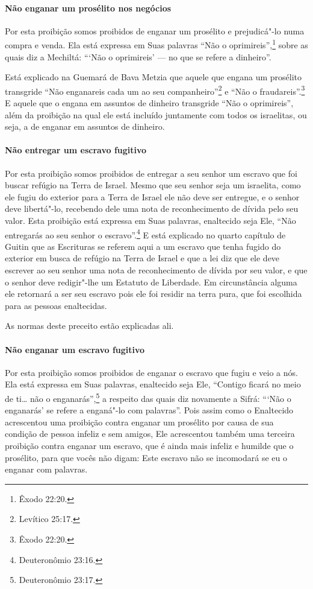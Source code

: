 \begin{multicols}{2}
\paragraph{Não enganar um prosélito nos negócios}

Por esta proibição somos proibidos de enganar um prosélito e
prejudicá"-lo numa compra e venda. Ela está expressa em Suas palavras
``Não o oprimireis'',\footnote{Êxodo 22:20.} sobre as quais diz a Mechiltá\starr: ```Não o
oprimireis' --- no que se refere a dinheiro''.

Está explicado na Guemará\starr{} de Bava Metzia\starr{} que aquele que engana um
prosélito transgride ``Não enganareis cada um ao seu companheiro''\footnote{Levítico 25:17.} e ``Não o fraudareis''.\footnote{Êxodo 22:20.} E aquele que o
engana em assuntos de dinheiro transgride ``Não o oprimireis'', além da
proibição na qual ele está incluído juntamente com todos os israelitas,
ou seja, a de enganar em assuntos de dinheiro.

\paragraph{Não entregar um escravo fugitivo}

Por esta proibição somos proibidos de entregar a seu senhor um escravo
que foi buscar refúgio na Terra de Israel. Mesmo que seu senhor seja um
israelita, como ele fugiu do exterior para a Terra de Israel ele não
deve ser entregue, e o senhor deve libertá"-lo, recebendo dele uma nota
de reconhecimento de dívida pelo seu valor. Esta proibição está
expressa em Suas palavras, enaltecido seja Ele, ``Não entregarás ao seu
senhor o escravo''.\footnote{Deuteronômio 23:16.} E está explicado no quarto
capítulo de Guitin\starr{} que as Escrituras se referem aqui a um escravo que
tenha fugido do exterior em busca de refúgio na Terra de Israel e que a
lei diz que ele deve escrever ao seu senhor uma nota de reconhecimento
de dívida por seu valor, e que o senhor deve redigir"-lhe um Estatuto de
Liberdade. Em circunstância alguma ele retornará a ser seu escravo pois
ele foi residir na terra pura, que foi escolhida para as pessoas
enaltecidas.

As normas deste preceito estão explicadas ali.

\paragraph{Não enganar um escravo fugitivo}

Por esta proibição somos proibidos de enganar o escravo que fugiu e veio
a nós. Ela está expressa em Suas palavras, enaltecido seja Ele,
``Contigo ficará no meio de ti\ldots{} não o enganarás'',\footnote{Deuteronômio
23:17.} a respeito das quais diz novamente a Sifrá\starr: ```Não o enganarás'
se refere a enganá"-lo com palavras''. Pois assim como o Enaltecido
acrescentou uma proibição contra enganar um prosélito por causa de sua
condição de pessoa infeliz e sem amigos, Ele acrescentou também uma
terceira proibição contra enganar um escravo, que é ainda mais infeliz e
humilde que o prosélito, para que vocês não digam: Este escravo não se
incomodará se eu o enganar com palavras.


\end{multicols}
